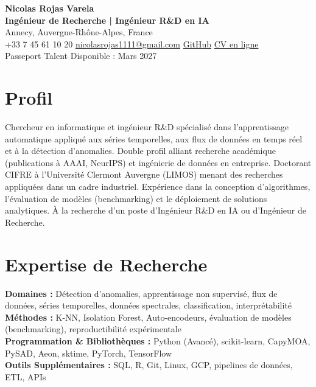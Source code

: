 \documentclass[12pt,a4paper]{article}
\begin{document}
{\centering
{\LARGE\textbf{Nicolas Rojas Varela}}\\[0.5mm]
{\large\textbf{Ingénieur de Recherche | Ingénieur R\&D en IA}}\\[0.5mm]
Annecy, Auvergne-Rhône-Alpes, France\\
+33 7 45 61 10 20 \textbar{} \href{mailto:nicolasrojas1111@gmail.com}{nicolasrojas1111@gmail.com} \textbar{} \href{https://github.com/nirojasva}{GitHub} \textbar{} \href{https://nirojasva.github.io/cv/}{CV en ligne}\\
Passeport Talent \textbar{} Disponible : Mars 2027\par}
\vspace{1pt}

\section*{Profil}
Chercheur en informatique et ingénieur R\&D spécialisé dans l'apprentissage automatique appliqué aux séries temporelles, aux flux de données en temps réel et à la détection d'anomalies. Double profil alliant recherche académique (publications à AAAI, NeurIPS) et ingénierie de données en entreprise. Doctorant CIFRE à l'Université Clermont Auvergne (LIMOS) menant des recherches appliquées dans un cadre industriel. Expérience dans la conception d'algorithmes, l'évaluation de modèles (benchmarking) et le déploiement de solutions analytiques. À la recherche d'un poste d'Ingénieur R\&D en IA ou d'Ingénieur de Recherche.

\section*{Expertise de Recherche}
\textbf{Domaines :} Détection d'anomalies, apprentissage non supervisé, flux de données, séries temporelles, données spectrales, classification, interprétabilité\\
\textbf{Méthodes :} K-NN, Isolation Forest, Auto-encodeurs, évaluation de modèles (benchmarking), reproductibilité expérimentale\\
\textbf{Programmation \& Bibliothèques :} Python (Avancé), scikit-learn, CapyMOA, PySAD, Aeon, sktime, PyTorch, TensorFlow\\
\textbf{Outils Supplémentaires :} SQL, R, Git, Linux, GCP, pipelines de données, ETL, APIs
\end{document}
